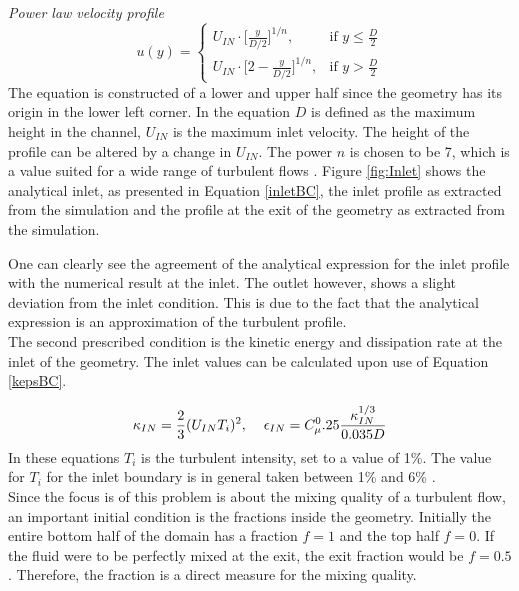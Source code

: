 \documentclass{CFD2017}
\begin{document}
\emph{Power law velocity profile}
\begin{equation}
\label{inletBC}
u(y) = \begin{cases} U_{IN}\cdot \big[\frac{y}{D/2}\big]^{1/n}, & \mbox{if } y\leq\frac{D}{2} \\ U_{IN}\cdot \big[2-\frac{y}{D/2}\big]^{1/n}, & \mbox{if } y>\frac{D}{2}\end{cases}
\end{equation}
The equation is constructed of a lower and upper half since the geometry has its origin in the lower left corner. In the equation $D$ is defined as the maximum height in the channel, $U_{IN}$ is the maximum inlet velocity. The height of the profile can be altered by a change in $U_{IN}$. The power $n$ is chosen to be 7, which is a value suited for a wide range of turbulent flows \cite{Morrison}. Figure \ref{fig:Inlet} shows the analytical inlet, as presented in Equation \ref{inletBC}, the inlet profile as extracted from the simulation and the profile at the exit of the geometry as extracted from the simulation.


One can clearly see the agreement of the analytical expression for the inlet profile with the numerical result at the inlet. The outlet however, shows a slight deviation from the inlet condition. This is due to the fact that the analytical expression is an approximation of the turbulent profile.\\
The second prescribed condition is the kinetic energy and dissipation rate at the inlet of the geometry. The inlet values can be calculated upon use of Equation \ref{kepsBC}.

\begin{equation}
\label{kepsBC}
\kappa_{IN}=\frac{2}{3}(U_{IN}T_i)^2,\hspace{4mm}\epsilon_{IN}=C_{\mu}^0.25\frac{\kappa_{IN}^{1/3}}{0.035 D}
\end{equation}
In these equations $T_i$ is the turbulent intensity, set to a value of 1\%. The value for $T_i$ for the inlet boundary is in general taken between 1\% and 6\% \cite{Versteeg2007}.\\
Since the focus is of this problem is about the mixing quality of a turbulent flow, an important initial condition is the fractions inside the geometry. Initially the entire bottom half of the domain has a fraction $f=1$ and the top half $f=0$. If the fluid were to be perfectly mixed at the exit, the exit fraction would be $f=0.5$. Therefore, the fraction is a direct measure for the mixing quality.\\
\end{document}
